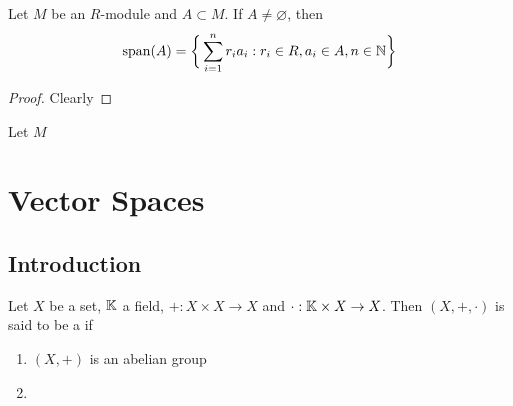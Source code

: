 \documentclass{book}
\begin{document}
	\begin{ex}
		Let $M$ be an $R$-module and $A \subset M$. If $A \neq \varnothing$, then $$\operatorname{span}(A) = \bigg \{\sum\limits_{i=1}^n r_ia_i: r_i \in R, a_i \in A, n \in \mathbb{N} \bigg \}$$
	\end{ex}
	
	\begin{proof}
		Clearly 
	\end{proof}
	
	\begin{defn}
		Let $M$
	\end{defn}
	
	
	
	
	
	
	
	
	
	
	
	
	
	
	
	
	
	
	
	
	
	
	
	
	
	
	
	
	
	
	
	
	
	
	
	
	
	
	
	
	
	
	
	
	
	
	
	
	
	
	
	
	
	
	
	
	
	
	
	
	
	
	\newpage
	\chapter{Vector Spaces}

	
	\section{Introduction}
	
	\begin{defn}
		Let $X$ be a set, $\mathbb{K}$ a field, $+:X \times X \rightarrow X$ and $\cdot:\mathbb{K} \times X \rightarrow X$. Then $(X, +, \cdot)$ is said to be a  if 
		\begin{enumerate}
			\item $(X, +)$ is an abelian group
			\item 
		\end{enumerate} 
	\end{defn}
	
\end{document}
